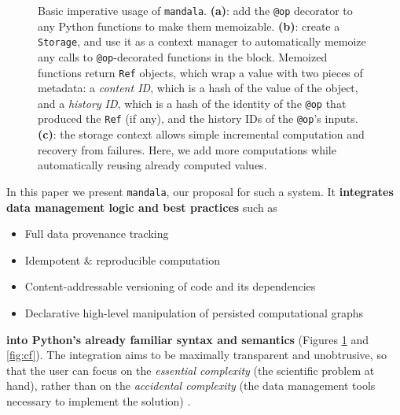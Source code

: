 \begin{figure}[h]
\begin{subfigure}{0.4\textwidth}
\caption{}
\end{subfigure}
\caption{Basic imperative usage of \texttt{mandala}. \textbf{(a)}: add the \texttt{@op}
decorator to any Python functions to make them memoizable. \textbf{(b)}:
create a \texttt{Storage}, and use it as a context manager to automatically
memoize any calls to \texttt{@op}-decorated functions in the block. Memoized
functions return \texttt{Ref} objects, which wrap a value with two pieces of
metadata: a \emph{content ID}, which is a hash of the value of the
object, and a \emph{history ID}, which is a hash of the identity of the
\texttt{@op} that produced the \texttt{Ref} (if any), and the history IDs of the
\texttt{@op}'s inputs. \textbf{(c)}: the storage context allows simple
incremental computation and recovery from failures. Here, we add more
computations while automatically reusing already computed values.}
\label{fig:basic-usage}
\end{figure}

In this paper we present \texttt{mandala}, our proposal for such a system. It \textbf{integrates data management logic and best practices} such as
\begin{itemize}
\item Full data provenance tracking
\item Idempotent \& reproducible computation
\item Content-addressable versioning of code and its dependencies
\item Declarative high-level manipulation of persisted computational graphs
\end{itemize}
\textbf{into Python's already familiar syntax and semantics} (Figures
\ref{fig:basic-usage} and \ref{fig:cf}). The integration aims to be maximally
transparent and unobtrusive, so that the user can focus on the \emph{essential
complexity} (the scientific problem at hand), rather than on the
\emph{accidental complexity} (the data management tools necessary to implement the solution) \citep{Brooks1987NoSB}.

